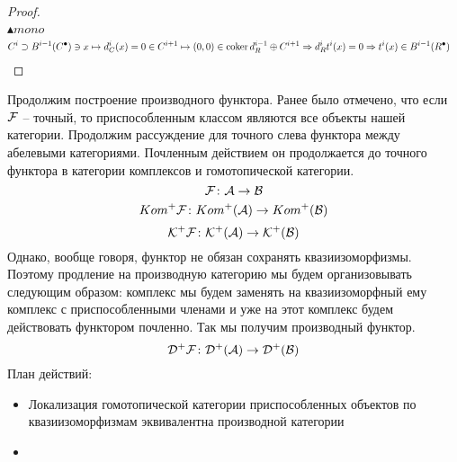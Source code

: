 \documentclass[../main.tex]{subfiles}
\begin{document}
\begin{proof}
\begin{align*}
\end{align*}
$\blacktriangle mono$
\begin{align*}
    C^{i} \supset B^{i-1}(C^\bullet) \ni x \mapsto d^i_C(x) = 0 \in C^{i+1} \mapsto (0, 0) \in \operatorname{coker} d^{i-1}_R\oplus C^{i+1} & \Rightarrow d^i_Rt^i(x) = 0 \Rightarrow t^i(x) \in B^{i-1}(R^\bullet)
\end{align*}
\end{proof}
Продолжим построение производного функтора. Ранее было отмечено, что если $\mathcal{F}$ -- точный, то приспособленным классом являются все объекты нашей категории. Продолжим рассуждение для точного слева функтора между абелевыми категориями. Почленным действием он продолжается до точного функтора в категории комплексов и гомотопической категории.
\[\mathcal{F}\colon \mathcal{A} \to \mathcal{B}\]
\[Kom^+\mathcal{F}\colon Kom^+(\mathcal{A}) \to Kom^+(\mathcal{B})\]
\[\mathcal{K^+ F}\colon \mathcal{K^+(\mathcal{A})} \to \mathcal{K^+(\mathcal{B})}\]
Однако, вообще говоря, функтор не обязан сохранять квазиизоморфизмы. Поэтому продление на производную категорию мы будем организовывать следующим образом: комплекс мы будем заменять на квазиизоморфный ему комплекс с приспособленными членами и уже на этот комплекс будем действовать функтором почленно. Так мы получим производный функтор.
\[\mathcal{D^+ F} \colon \mathcal{D^+(\mathcal{A})} \to \mathcal{D^+(\mathcal{B})}\]
План действий:\\
\begin{itemize}
    \item Локализация гомотопической категории приспособленных объектов по квазиизоморфизмам эквивалентна производной категории
    \item {}
\end{itemize}
\end{document}
